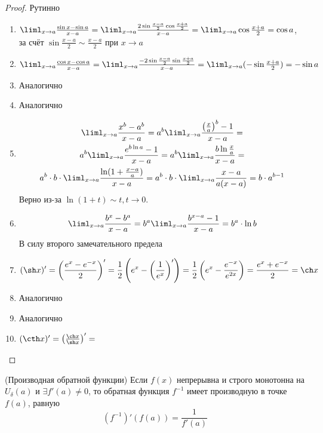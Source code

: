 \begin{proof}
	Рутинно
	\begin{enumerate}
		\item $\liml_{x \to a} \frac{\sin x - \sin a}{x - a} = \liml_{x \to a} \frac{2 \sin \frac{x - a}{2} \cos \frac{x + a}{2}}{x - a} = \liml_{x \to a} \cos \frac{x + a}{2} = \cos a$, за счёт $\sin \frac{x - a}{2} \sim \frac{x - a}{2}$ при $x \to a$
		
		\item $\liml_{x \to a} \frac{\cos x - \cos a}{x - a} = \liml_{x \to a} \frac{-2 \sin \frac{x - a}{2} \sin \frac{x + a}{2}}{x - a} = \liml_{x \to a} (-\sin \frac{x + a}{2}) = -\sin a$
		
		\item Аналогично
		\item Аналогично
		\item 
		\begin{multline*}
		\liml_{x \to a} \frac{x^b - a^b}{x - a} = a^b \liml_{x \to a} \frac{\left(\frac{x}{a}\right)^b - 1}{x - a} = \\
		a^b \liml_{x \to a} \frac{e^{b \ln a} - 1}{x - a} = a^b \liml_{x \to a} \frac{b \ln \frac{x}{a}}{x - a} = \\
		a^b \cdot b \cdot \liml_{x \to a} \frac{\ln(1 + \frac{x - a}{a})}{x - a} = a^b \cdot b \cdot \liml_{x \to a} \frac{x - a}{a(x - a)} = b \cdot a^{b - 1}
		\end{multline*}
		Верно из-за $\ln (1 + t) \sim t, t \to 0$.
		
		\item
		$$
			\liml_{x \to a} \frac{b^x - b^a}{x - a} = b^a \liml_{x \to a} \frac{b^{x - a} - 1}{x - a} = b^a \cdot \ln b
		$$
		В силу второго замечательного предела
		
		\item
		$$
			(\sh x)' = \left(\frac{e^x - e^{-x}}{2}\right)' = \frac{1}{2}\left(e^x - \left(\frac{1}{e^x}\right)'\right) = \frac{1}{2}\left(e^x - \frac{e^{-x}}{e^{2x}}\right) = \frac{e^x + e^{-x}}{2} = \ch x
		$$
		
		\item Аналогично
		\item Аналогично
		\item $(\cth x)' = \left(\frac{\ch x}{\sh x}\right)' = \frac{}{}$
		
	\end{enumerate}
\end{proof}

\begin{theorem} (Производная обратной функции)
	Если $f(x)$ непрерывна и строго монотонна на $U_{\delta}(a)$ и $\exists f'(a) \neq 0$, то обратная функция $f^{-1}$ имеет производную в точке $f(a)$, равную
	$$
		(f^{-1})'(f(a)) = \frac{1}{f'(a)}
	$$
\end{theorem}

